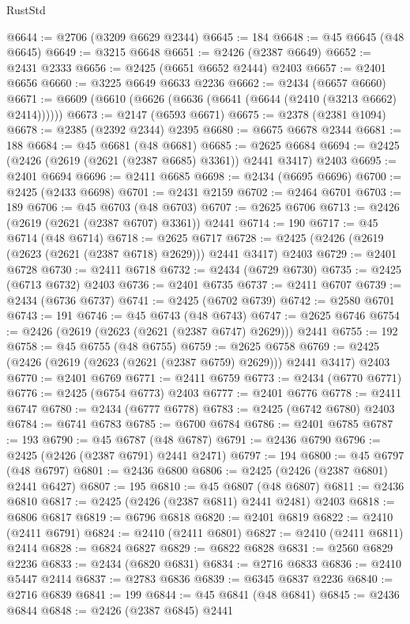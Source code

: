 \begin{lexlean}{RustStd}
\begin{coremodule}
@6644 := @2706 (@3209 @6629 @2344)
@6645 := 184
@6648 := @45 @6645 (@48 @6645)
@6649 := @3215 @6648
@6651 := @2426 (@2387 @6649)
@6652 := @2431 @2333
@6656 := @2425 (@6651 @6652 @2444) @2403
@6657 := @2401 @6656
@6660 := @3225 @6649 @6633 @2236
@6662 := @2434 (@6657 @6660)
@6671 := @6609 (@6610 (@6626 (@6636 (@6641 (@6644 (@2410 (@3213 @6662) @2414))))))
@6673 := @2147 (@6593 @6671)
@6675 := @2378 (@2381 @1094)
@6678 := @2385 (@2392 @2344) @2395
@6680 := @6675 @6678 @2344
@6681 := 188
@6684 := @45 @6681 (@48 @6681)
@6685 := @2625 @6684
@6694 := @2425 (@2426 (@2619 (@2621 (@2387 @6685) @3361)) @2441 @3417) @2403
@6695 := @2401 @6694
@6696 := @2411 @6685
@6698 := @2434 (@6695 @6696)
@6700 := @2425 (@2433 @6698)
@6701 := @2431 @2159
@6702 := @2464 @6701
@6703 := 189
@6706 := @45 @6703 (@48 @6703)
@6707 := @2625 @6706
@6713 := @2426 (@2619 (@2621 (@2387 @6707) @3361)) @2441
@6714 := 190
@6717 := @45 @6714 (@48 @6714)
@6718 := @2625 @6717
@6728 := @2425 (@2426 (@2619 (@2623 (@2621 (@2387 @6718) @2629))) @2441 @3417) @2403
@6729 := @2401 @6728
@6730 := @2411 @6718
@6732 := @2434 (@6729 @6730)
@6735 := @2425 (@6713 @6732) @2403
@6736 := @2401 @6735
@6737 := @2411 @6707
@6739 := @2434 (@6736 @6737)
@6741 := @2425 (@6702 @6739)
@6742 := @2580 @6701
@6743 := 191
@6746 := @45 @6743 (@48 @6743)
@6747 := @2625 @6746
@6754 := @2426 (@2619 (@2623 (@2621 (@2387 @6747) @2629))) @2441
@6755 := 192
@6758 := @45 @6755 (@48 @6755)
@6759 := @2625 @6758
@6769 := @2425 (@2426 (@2619 (@2623 (@2621 (@2387 @6759) @2629))) @2441 @3417) @2403
@6770 := @2401 @6769
@6771 := @2411 @6759
@6773 := @2434 (@6770 @6771)
@6776 := @2425 (@6754 @6773) @2403
@6777 := @2401 @6776
@6778 := @2411 @6747
@6780 := @2434 (@6777 @6778)
@6783 := @2425 (@6742 @6780) @2403
@6784 := @6741 @6783
@6785 := @6700 @6784
@6786 := @2401 @6785
@6787 := 193
@6790 := @45 @6787 (@48 @6787)
@6791 := @2436 @6790
@6796 := @2425 (@2426 (@2387 @6791) @2441 @2471)
@6797 := 194
@6800 := @45 @6797 (@48 @6797)
@6801 := @2436 @6800
@6806 := @2425 (@2426 (@2387 @6801) @2441 @6427)
@6807 := 195
@6810 := @45 @6807 (@48 @6807)
@6811 := @2436 @6810
@6817 := @2425 (@2426 (@2387 @6811) @2441 @2481) @2403
@6818 := @6806 @6817
@6819 := @6796 @6818
@6820 := @2401 @6819
@6822 := @2410 (@2411 @6791)
@6824 := @2410 (@2411 @6801)
@6827 := @2410 (@2411 @6811) @2414
@6828 := @6824 @6827
@6829 := @6822 @6828
@6831 := @2560 @6829 @2236
@6833 := @2434 (@6820 @6831)
@6834 := @2716 @6833
@6836 := @2410 @5447 @2414
@6837 := @2783 @6836
@6839 := @6345 @6837 @2236
@6840 := @2716 @6839
@6841 := 199
@6844 := @45 @6841 (@48 @6841)
@6845 := @2436 @6844
@6848 := @2426 (@2387 @6845) @2441

\end{coremodule}
\end{lexlean}
